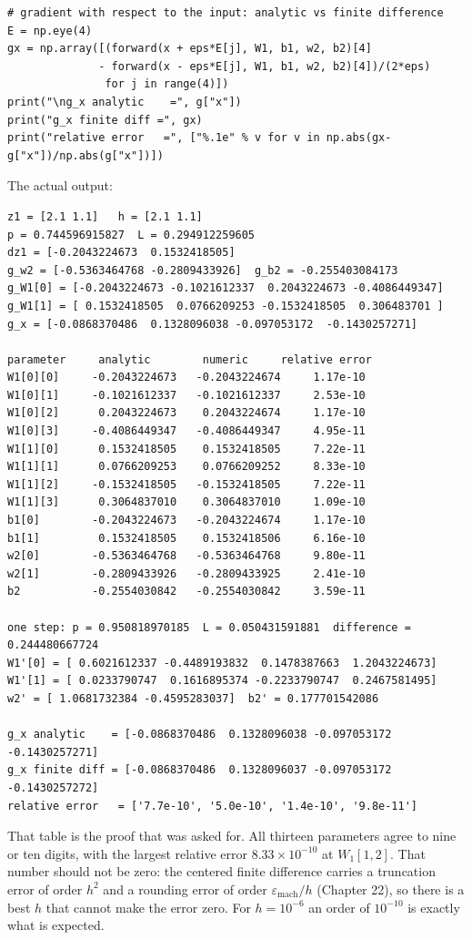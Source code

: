\begin{lab}
\begin{verbatim}
# gradient with respect to the input: analytic vs finite difference
E = np.eye(4)
gx = np.array([(forward(x + eps*E[j], W1, b1, w2, b2)[4]
              - forward(x - eps*E[j], W1, b1, w2, b2)[4])/(2*eps)
               for j in range(4)])
print("\ng_x analytic    =", g["x"])
print("g_x finite diff =", gx)
print("relative error   =", ["%.1e" % v for v in np.abs(gx-g["x"])/np.abs(g["x"])])
\end{verbatim}
The actual output:
\begin{verbatim}
z1 = [2.1 1.1]   h = [2.1 1.1]
p = 0.744596915827  L = 0.294912259605
dz1 = [-0.2043224673  0.1532418505]
g_w2 = [-0.5363464768 -0.2809433926]  g_b2 = -0.255403084173
g_W1[0] = [-0.2043224673 -0.1021612337  0.2043224673 -0.4086449347]
g_W1[1] = [ 0.1532418505  0.0766209253 -0.1532418505  0.306483701 ]
g_x = [-0.0868370486  0.1328096038 -0.097053172  -0.1430257271]

parameter     analytic        numeric     relative error
W1[0][0]     -0.2043224673   -0.2043224674     1.17e-10
W1[0][1]     -0.1021612337   -0.1021612337     2.53e-10
W1[0][2]      0.2043224673    0.2043224674     1.17e-10
W1[0][3]     -0.4086449347   -0.4086449347     4.95e-11
W1[1][0]      0.1532418505    0.1532418505     7.22e-11
W1[1][1]      0.0766209253    0.0766209252     8.33e-10
W1[1][2]     -0.1532418505   -0.1532418505     7.22e-11
W1[1][3]      0.3064837010    0.3064837010     1.09e-10
b1[0]        -0.2043224673   -0.2043224674     1.17e-10
b1[1]         0.1532418505    0.1532418506     6.16e-10
w2[0]        -0.5363464768   -0.5363464768     9.80e-11
w2[1]        -0.2809433926   -0.2809433925     2.41e-10
b2           -0.2554030842   -0.2554030842     3.59e-11

one step: p = 0.950818970185  L = 0.050431591881  difference = 0.244480667724
W1'[0] = [ 0.6021612337 -0.4489193832  0.1478387663  1.2043224673]
W1'[1] = [ 0.0233790747  0.1616895374 -0.2233790747  0.2467581495]
w2' = [ 1.0681732384 -0.4595283037]  b2' = 0.177701542086

g_x analytic    = [-0.0868370486  0.1328096038 -0.097053172  -0.1430257271]
g_x finite diff = [-0.0868370486  0.1328096037 -0.097053172  -0.1430257272]
relative error   = ['7.7e-10', '5.0e-10', '1.4e-10', '9.8e-11']
\end{verbatim}
\end{lab}

That table is the proof that was asked for. All thirteen parameters agree to nine or ten digits,
with the largest relative error $8.33\times10^{-10}$ at $W_{1}[1,2]$. That number should not be
zero: the centered finite difference carries a truncation error of order $h^{2}$ and a rounding
error of order $\varepsilon_{\mathrm{mach}}/h$ (Chapter 22), so there is a best $h$ that cannot
make the error zero. For $h=10^{-6}$ an order of $10^{-10}$ is exactly what is expected.
 

